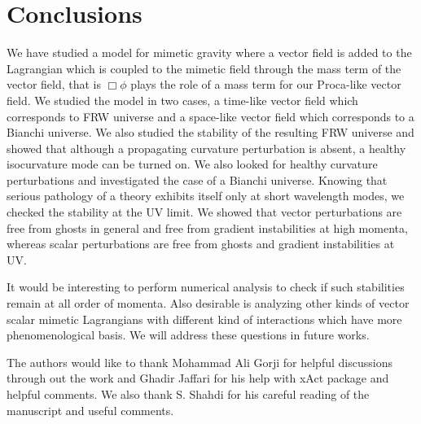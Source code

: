 \documentclass[%
 reprint,
 amsmath,amssymb,
 aps,
]{revtex4-1}
\begin{document}
\section{Conclusions}
We have studied a model for mimetic gravity where a vector field is added to the Lagrangian which is coupled to the mimetic field through the mass term of the vector field, that is $\Box\phi$ plays the role of a mass term for our Proca-like vector field. We studied the model in two cases,  a  time-like vector field which corresponds to FRW universe and a space-like vector field which corresponds to a Bianchi universe. We also studied the stability of the resulting FRW universe and showed that although a propagating curvature perturbation is absent, a healthy isocurvature mode can be turned on. We also looked for healthy curvature perturbations and  investigated the case of a  Bianchi universe. Knowing that serious pathology of a  theory exhibits itself only at short wavelength modes, we checked the stability at the UV limit. We showed that vector perturbations are free from ghosts in general and free from gradient instabilities at high momenta, whereas scalar perturbations are free from ghosts and gradient instabilities at UV.

It would be interesting to perform numerical analysis to check if such stabilities remain at all order of momenta. Also desirable is analyzing other kinds of vector scalar mimetic Lagrangians with different kind of interactions which have more phenomenological basis. We will address these questions in future works.
\begin{acknowledgments}
The authors would like to thank Mohammad Ali Gorji for helpful discussions through out the work and Ghadir Jaffari for his help with xAct package \cite{Brizuela:2008ra,Nutma:2013zea} and  helpful comments. We also thank S. Shahdi for his careful reading of the manuscript and useful comments.
\end{acknowledgments}


\appendix
\end{document}
